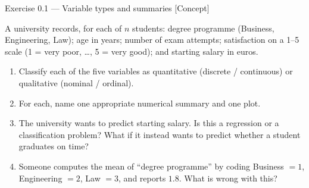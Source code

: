 \documentclass[aspectratio=169,11pt]{beamer}
\begin{document}
\begin{frame}{Exercise 0.1 --- Variable types and summaries [Concept]}
  \begin{exercise}
    A university records, for each of $n$ students: degree programme
    (Business, Engineering, Law); age in years; number of exam attempts;
    satisfaction on a 1--5 scale (1 = very poor, \dots, 5 = very good);
    and starting salary in euros.
    \begin{enumerate}
      \item Classify each of the five variables as quantitative (discrete /
            continuous) or qualitative (nominal / ordinal).
      \item For each, name one appropriate numerical summary and one plot.
      \item The university wants to predict starting salary. Is this a
            regression or a classification problem? What if it instead wants
            to predict whether a student graduates on time?
      \item Someone computes the mean of ``degree programme'' by coding
            Business $=1$, Engineering $=2$, Law $=3$, and reports $1.8$.
            What is wrong with this?
    \end{enumerate}
  \end{exercise}
\end{frame}
\end{document}
